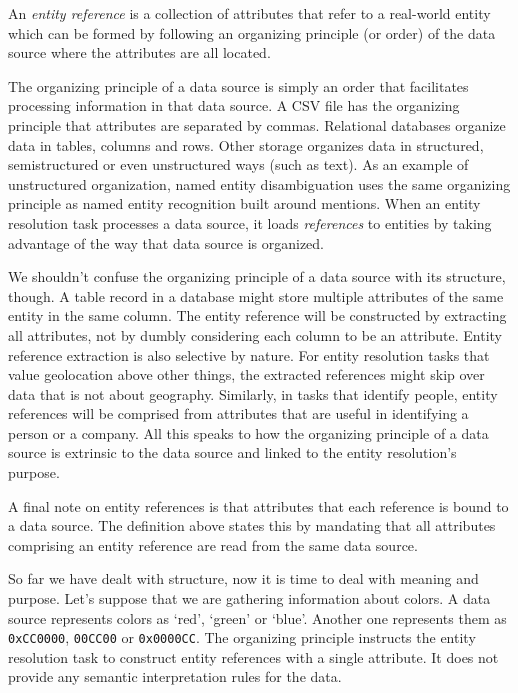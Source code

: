 \documentclass[journal]{IEEEtran}
\begin{document}
    \begin{defn}
        An \textit{entity reference} is a collection of attributes that refer
        to a real-world entity which can be formed by following an organizing
        principle (or order) of the data source where the attributes are all
        located.
    \end{defn}

    The organizing principle of a data source is simply an order that
    facilitates processing information in that data source.
    A CSV file has the organizing principle that attributes are separated by
    commas.
    Relational databases organize data in tables, columns and rows.
    Other storage organizes data in structured, semistructured or even
    unstructured ways (such as text).
    As an example of unstructured organization, named entity disambiguation uses
    the same organizing principle as named entity recognition built around
    mentions.
    When an entity resolution task processes a data source, it loads
    \textit{references}\cite{Ben2009Swoosh} to entities by taking advantage of
    the way that data source is organized.

    We shouldn't confuse the organizing principle of a data source with its
    structure, though.
    A table record in a database might store multiple attributes of the same
    entity in the same column.
    The entity reference will be constructed by extracting all attributes, not
    by dumbly considering each column to be an attribute.
    Entity reference extraction is also selective by nature.
    For entity resolution tasks that value geolocation above other things, the
    extracted references might skip over data that is not about geography.
    Similarly, in tasks that identify people, entity references will be
    comprised from attributes that are useful in identifying a person or a
    company.
    All this speaks to how the organizing principle of a data source is
    extrinsic to the data source and linked to the entity resolution's purpose.

    A final note on entity references is that attributes that each reference is
    bound to a data source.
    The definition above states this by mandating that all attributes comprising
    an entity reference are read from the same data source.

    So far we have dealt with structure, now it is time to deal with meaning and
    purpose.    
    Let's suppose that we are gathering information about colors.
    A data source represents colors as `red', `green' or `blue'.
    Another one represents them as \texttt{0xCC0000}, \texttt{00CC00} or
    \texttt{0x0000CC}.
    The organizing principle instructs the entity resolution task to construct
    entity references with a single attribute.
    It does not provide any semantic interpretation rules for the data.
    
\end{document}

